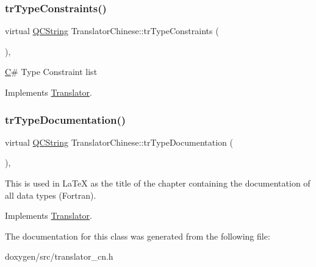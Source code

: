 \subsubsection{\texorpdfstring{trTypeConstraints()}{trTypeConstraints()}}
{\footnotesize\ttfamily virtual \mbox{\hyperlink{class_q_c_string}{Q\+C\+String}} Translator\+Chinese\+::tr\+Type\+Constraints (\begin{DoxyParamCaption}{ }\end{DoxyParamCaption})\hspace{0.3cm}{\ttfamily [inline]}, {\ttfamily [virtual]}}

\mbox{\hyperlink{class_c}{C}}\# Type Constraint list 

Implements \mbox{\hyperlink{class_translator}{Translator}}.

\mbox{\label{class_translator_chinese_ad7774d0b6f934b0bc8ee4b9f3d2e2bfc}} 
\subsubsection{\texorpdfstring{trTypeDocumentation()}{trTypeDocumentation()}}
{\footnotesize\ttfamily virtual \mbox{\hyperlink{class_q_c_string}{Q\+C\+String}} Translator\+Chinese\+::tr\+Type\+Documentation (\begin{DoxyParamCaption}{ }\end{DoxyParamCaption})\hspace{0.3cm}{\ttfamily [inline]}, {\ttfamily [virtual]}}

This is used in La\+TeX as the title of the chapter containing the documentation of all data types (Fortran). 

Implements \mbox{\hyperlink{class_translator}{Translator}}.



The documentation for this class was generated from the following file\+:\begin{DoxyCompactItemize}
\item 
doxygen/src/translator\+\_\+cn.\+h\end{DoxyCompactItemize}
